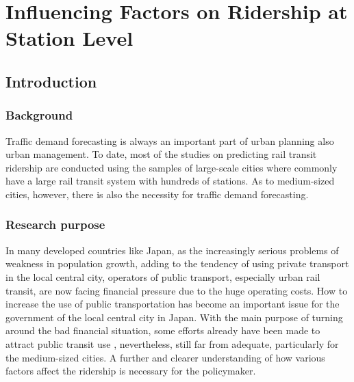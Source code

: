 \chapter{Influencing Factors on Ridership at Station Level}
%
\section{Introduction}

\subsection{Background}
%
Traffic demand forecasting is always an important part of urban planning also urban management. To date, most of the studies on predicting rail transit ridership are conducted using the samples of large-scale cities where commonly have a large rail transit system with hundreds of stations. As to medium-sized cities, however, there is also the necessity for traffic demand forecasting. 

\subsection{Research purpose}
%
In many developed countries like Japan, as the increasingly serious problems of weakness in population growth, adding to the tendency of using private transport in the local central city, operators of public transport, especially urban rail transit, are now facing financial pressure due to the huge operating costs. How to increase the use of public transportation has become an important issue for the government of the local central city in Japan. With the main purpose of turning around the bad financial situation, some efforts already have been made to attract public transit use \cite{takashi2015study}, nevertheless, still far from adequate, particularly for the medium-sized cities. A further and clearer understanding of how various factors affect the ridership is necessary for the policymaker.


